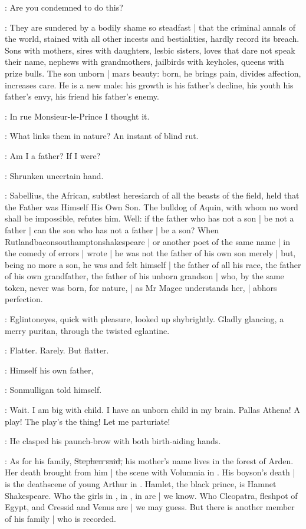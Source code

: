 \StephenInt:
Are you condemned to do this?

\Stephen:
They are sundered by a bodily shame so steadfast |
that the criminal annals of the world,
stained with all other incests and bestialities,
hardly record its breach.
Sons with mothers,
sires with daughters,
lesbic sisters,
loves that dare not speak their name,
nephews with grandmothers,
jailbirds with keyholes,
queens with prize bulls.
The son unborn |
mars beauty:
born,
he brings pain,
divides affection,
increases care.
He is a new male:
his growth is his father's decline,
his youth his father's envy,
his friend his father's enemy.

\StephenInt:
In rue Monsieur-le-Prince
I thought it.

\Stephen:
What links them in nature?
An instant of blind rut.

\StephenInt:
Am I a father?
If I were?

\StephenInt:
Shrunken uncertain hand.

\Stephen:
Sabellius, the African,
subtlest heresiarch of all the beasts of the field,
held that the Father was Himself His Own Son.
The bulldog of Aquin,
with whom no word shall be impossible,
refutes him.
Well:
if the father who has not a son |
be not a father |
can the son who has not a father |
be a son?
When Rutlandbaconsouthamptonshakespeare |
or another poet of the same name |
in the comedy of errors |
wrote  |
he was not the father of his own son merely |
but, being no more a son,
he was and felt himself |
the father of all his race,
the father of his own grandfather,
the father of his unborn grandson |
who, by the same token,
never was born,
for nature, |
as Mr Magee understands her, |
abhors perfection.

:
Eglintoneyes,
quick with pleasure,
looked up shybrightly.
Gladly glancing,
a merry puritan,
through the twisted eglantine.

\StephenInt:
Flatter.
Rarely.
But flatter.

\mulligan:
Himself his own father,

:
Sonmulligan told himself.

\mulligan:
Wait.
I am big with child.
I have an unborn child in my brain.
Pallas Athena!
A play!
The play's the thing!
Let me parturiate!

:
He clasped his paunch-brow with both birth-aiding hands.

\Stephen:
As for his family,
\sout{Stephen said,}
his mother's name lives in the forest of Arden.
Her death brought from him |
the scene with Volumnia in .
His boyson's death |
is the deathscene of young Arthur in .
Hamlet, the black prince,
is Hamnet Shakespeare.
Who the girls in ,
in ,
in  are |
we know.
Who Cleopatra,
fleshpot of Egypt,
and Cressid and Venus are |
we may guess.
But there is another member of his family |
who is recorded.

